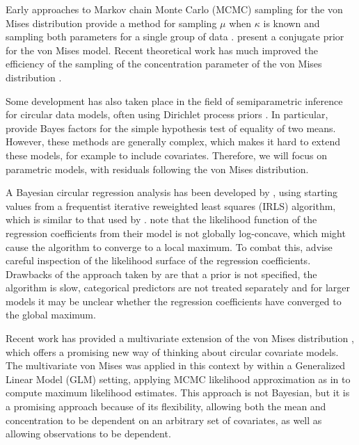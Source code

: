 \documentclass[11pt,a4paper]{article}\usepackage[]{graphicx}\usepackage[]{color}
\begin{document}
Early approaches to Markov chain Monte Carlo (MCMC) sampling for the von Mises distribution provide a method for sampling \( \mu \) when \( \kappa \) is known \citep{mardia1976bayesian} and sampling both parameters for a single group of data \citep{damien1999fullbayes}. \citet{guttorp1988finding} present a conjugate prior for the von Mises model. Recent theoretical work has much improved the efficiency of the sampling of the concentration parameter of the von Mises distribution \citep{forbes2015fast}.

Some development has also taken place in the field of semiparametric inference for circular data models, often using Dirichlet process priors \citep{Bhattacharya2009, ghosh2003semiparametric, george2006semiparametric, mcvinish2008semiparametric}. In particular, \citet{ghosh2003semiparametric} provide Bayes factors for the simple hypothesis test of equality of two means. However, these methods are generally complex, which makes it hard to extend these models, for example to include covariates. Therefore, we will focus on parametric models, with residuals following the von Mises distribution.

A Bayesian circular regression analysis has been developed by \citet{gill2010}, using starting values from a frequentist iterative reweighted least squares (IRLS) algorithm, which is similar to that used by \citet{fisher1992regression}. \citet{gill2010} note that the likelihood function of the regression coefficients from their model is not globally log-concave, which might cause the algorithm to converge to a local maximum. To combat this, \citet{gill2010} advise careful inspection of the likelihood surface of the regression coefficients. Drawbacks of the approach taken by \citet{gill2010} are that a prior is not specified, the algorithm is slow, categorical predictors are not treated separately and for larger models it may be unclear whether the regression coefficients have converged to the global maximum.

Recent work has provided a multivariate extension of the von Mises distribution \citep{mardia2008multivariate,mardia2014some}, which offers a promising new way of thinking about circular covariate models. The multivariate von Mises was applied in this context by \citet{lagona2015regression} within a Generalized Linear Model (GLM) setting, applying MCMC likelihood approximation as in \citet{geyer1992constrained} to compute maximum likelihood estimates. This approach is not Bayesian, but it is a promising approach because of its flexibility, allowing both the mean and concentration to be dependent on an arbitrary set of covariates, as well as allowing observations to be dependent.
\end{document}
